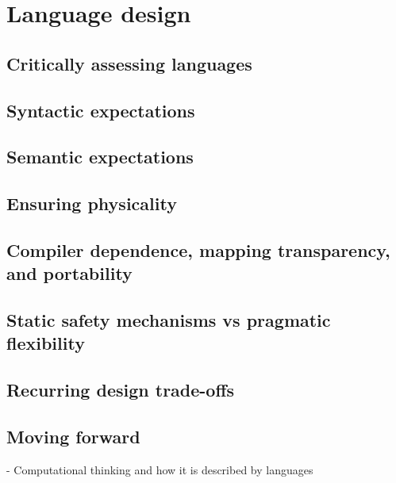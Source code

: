 \section{Language design}\label{sec:lit_rev:language_design}

\subsection{Critically assessing languages}\label{subsec:lit_rev:language_design:critically_assessing}

\subsection{Syntactic expectations}\label{subsec:lit_rev:language_design:syntactic_expectations}

\subsection{Semantic expectations}\label{subsec:lit_rev:language_design:semantics_expectations}

\subsection{Ensuring physicality}\label{subsec:lit_rev:language_design:ensuring_physicality}

\subsection{Compiler dependence, mapping transparency, and portability}\label{subsec:lit_rev:language_design:compiler_dependence}

\subsection{Static safety mechanisms vs pragmatic flexibility}\label{subsec:lit_rev:language_design:static_safety_vs_flexibility}

\subsection{Recurring design trade-offs}\label{subsec:lit_rev:language_design:recurring_tradeoffs}

\subsection{Moving forward}\label{subsec:lit_rev:language_design:moving_forward}

- Computational thinking and how it is described by languages